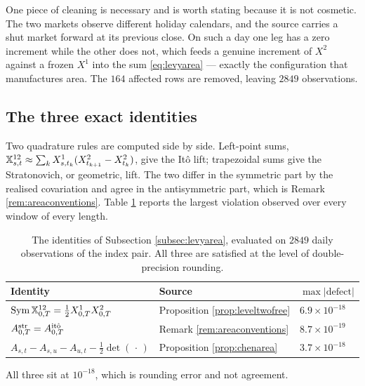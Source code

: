 One piece of cleaning is necessary and is worth stating because it is not cosmetic. The two markets
observe different holiday calendars, and the source carries a shut market forward at its previous
close. On such a day one leg has a zero increment while the other does not, which feeds a genuine
increment of $X^{2}$ against a frozen $X^{1}$ into the sum \eqref{eq:levyarea} --- exactly the
configuration that manufactures area. The $164$ affected rows are removed, leaving $2849$
observations.


\subsection{The three exact identities}
\label{subsec:levyidentities}

Two quadrature rules are computed side by side. Left-point sums,
$\mathbb{X}^{12}_{s,t}\approx\sum_{k}X^{1}_{s,t_{k}}(X^{2}_{t_{k+1}}-X^{2}_{t_{k}})$, give the Itô lift;
trapezoidal sums give the Stratonovich, or geometric, lift. The two differ in the symmetric part by
the realised covariation and agree in the antisymmetric part, which is Remark
\ref{rem:areaconventions}. Table \ref{tab:levyidentities} reports the largest violation observed
over every window of every length.

\begin{table}[H]
\centering
\small
\begin{tabular}{lll}
\hline
Identity & Source & $\max|\text{defect}|$\\
\hline
$\operatorname{Sym}\mathbb{X}^{12}_{0,T}=\tfrac12 X^{1}_{0,T}X^{2}_{0,T}$ &
  Proposition \ref{prop:leveltwofree} & $6.9\times10^{-18}$\\
$A^{\mathrm{str}}_{0,T}=A^{\mathrm{it\hat o}}_{0,T}$ &
  Remark \ref{rem:areaconventions} & $8.7\times10^{-19}$\\
$A_{s,t}-A_{s,u}-A_{u,t}-\tfrac12\det(\,\cdot\,)$ &
  Proposition \ref{prop:chenarea} & $3.7\times10^{-18}$\\
\hline
\end{tabular}
\caption[The three exact identities]{The identities of Subsection \ref{subsec:levyarea}, evaluated on $2849$ daily observations
of the index pair. All three are satisfied at the level of double-precision rounding.}
\label{tab:levyidentities}
\end{table} All three sit at $10^{-18}$, which is rounding error and not agreement. 

